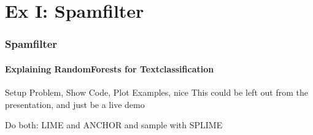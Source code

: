 \section{Ex I: Spamfilter}

\begin{frame}
	\frametitle{Spamfilter}
	\framesubtitle{Explaining RandomForests for Textclassification}
	Setup Problem, Show Code, Plot Examples, nice
	This could be left out from the presentation, and just be a live demo
	
	
	Do both: LIME and ANCHOR and sample with SPLIME
\end{frame}